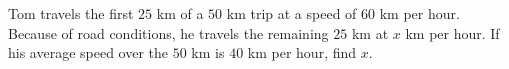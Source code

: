 Tom travels the first $25$ km of a $50$ km trip at a speed of $60$ km per hour. Because of road conditions, he travels the remaining $25$ km at $x$ km per hour. If his average speed over the $50$ km is $40$ km per hour, find $x$.

